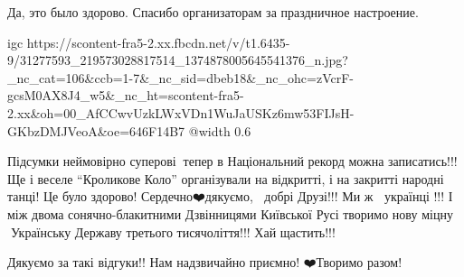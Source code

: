  
 
 
 
 

\qqSecCmt


Да, это было здорово. Спасибо организаторам за праздничное настроение.

\ifcmt
  igc https://scontent-fra5-2.xx.fbcdn.net/v/t1.6435-9/31277593_219573028817514_1374878005645541376_n.jpg?_nc_cat=106&ccb=1-7&_nc_sid=dbeb18&_nc_ohc=zVcrF-gcsM0AX8J4_w5&_nc_ht=scontent-fra5-2.xx&oh=00_AfCCwvUzkLWxVDn1WuJaUSKz6mw53FIJsH-GKbzDMJVeoA&oe=646F14B7
	@width 0.6
\fi


Підсумки неймовірно суперові💛💙тепер в Національний рекорд можна записатись!!!
Ще і веселе \enquote{Кроликове Коло} організували на відкритті, і на закритті народні
танці! Це було здорово! Сердечно❤️дякуємо, 💛💙добрі Друзі!!! Ми ж 💛💙українці
!!! І між двома сонячно-блакитними Дзвінницями Київської Русі творимо нову
міцну 💛💙Українську Державу третього тисячоліття!!! Хай щастить!!!

\begin{itemize} %

Дякуємо за такі відгуки!! Нам надзвичайно приємно! ❤️Творимо разом!
\end{itemize} %
